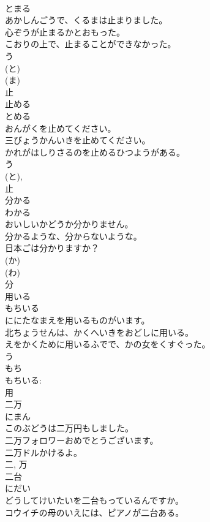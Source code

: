 \documentclass[8pt]{extreport}
\begin{document}
\begin{CJK}{UTF8}{min}
\\	とまる	
\\	あかしんごうで、くるまは止まりました。	
\\	心ぞうが止まるかとおもった。	
\\	こおりの上で、止まることができなかった。	
\\	う 
\\	(と) 
\\	(ま) 
\\	止	
\\	止める	
\\	とめる	
\\	おんがくを止めてください。	
\\	三びょうかんいきを止めてください。	
\\	かれがはしりさるのを止めるひつようがある。	
\\	う 
\\	(と), 
\\	止	
\\	分かる	
\\	わかる	
\\	おいしいかどうか分かりません。	
\\	分かるような、分からないような。	
\\	日本ごは分かりますか？	
\\	(か) 
\\	(わ) 
\\	分	
\\	用いる	
\\	もちいる	
\\	ににたなまえを用いるものがいます。	
\\	北ちょうせんは、かくへいきをおどしに用いる。	
\\	えをかくために用いるふでで、かの女をくすぐった。	
\\	う 
\\	もち 
\\	もちいる: 
\\	用	
\\	二万	
\\	にまん	
\\	このぶどうは二万円もしました。	
\\	二万フォロワーおめでとうございます。	
\\	二万ドルかけるよ。	
\\	二, 万	
\\	二台	
\\	にだい	
\\	どうしてけいたいを二台もっているんですか。	
\\	コウイチの母のいえには、ピアノが二台ある。	

\end{CJK}
\end{document}
